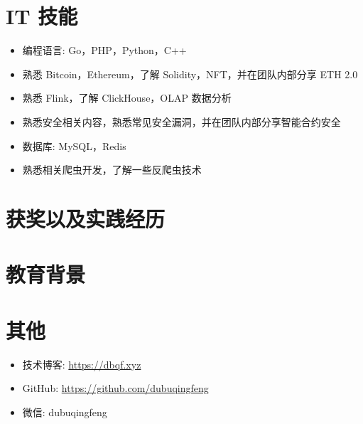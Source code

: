 \documentclass{resume}
\begin{document}
\section{IT 技能}
\begin{onehalfspacing}
\begin{itemize}[parsep=0.5ex]
  \item 编程语言: Go，PHP，Python，C++
  \item 熟悉 Bitcoin，Ethereum，了解 Solidity，NFT，并在团队内部分享 ETH 2.0
  \item 熟悉 Flink，了解 ClickHouse，OLAP 数据分析
  \item 熟悉安全相关内容，熟悉常见安全漏洞，并在团队内部分享智能合约安全
  \item 数据库: MySQL，Redis
  \item 熟悉相关爬虫开发，了解一些反爬虫技术
\end{itemize}
\end{onehalfspacing}

\section{获奖以及实践经历}

\section{教育背景}


\section{其他}
\begin{itemize}[parsep=0.5ex]
  \item 技术博客: \href{https://dbqf.xyz}{https://dbqf.xyz}
  \item GitHub: \href{https://github.com/dubuqingfeng}{https://github.com/dubuqingfeng}
  \item 微信: dubuqingfeng
\end{itemize}
\end{document}
